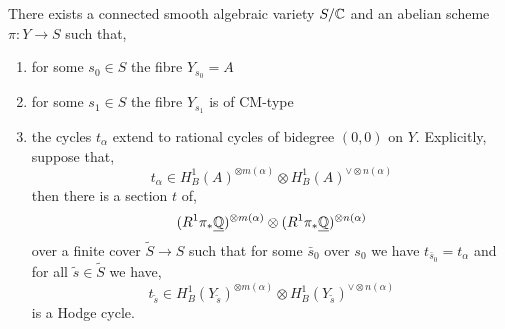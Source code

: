 \documentclass[12pt]{article}
\begin{document}
\begin{proposition}
There exists a connected smooth algebraic variety $S / \mathbb{C}$ and an abelian scheme $\pi : Y \to S$ such that,
\begin{enumerate}
\item for some $s_0 \in S$ the fibre $Y_{s_0} = A$
\item for some $s_1 \in S$ the fibre $Y_{s_1}$ is of CM-type
\item the cycles $t_\alpha$ extend to rational cycles of bidegree $(0,0)$ on $Y$. Explicitly, suppose that,
\[ t_\alpha \in H_B^1(A)^{\otimes m(\alpha)} \otimes H_B^1(A)^{\vee \otimes n(\alpha)} \]
then there is a section $t$ of,
\[ (R^1 \pi_* \underline{\mathbb{Q}})^{\otimes m(\alpha)} \otimes (R^1 \pi_* \underline{\mathbb{Q}})^{\otimes n(\alpha)} \]
over a finite cover $\tilde{S} \to S$ such that for some $\bar{s}_0$ over $s_0$ we have $t_{\bar{s}_0} = t_\alpha$ and for all $\tilde{s} \in \tilde{S}$ we have, 
\[ t_{\tilde{s}} \in H^1_B(Y_{\tilde{s}})^{\otimes m(\alpha)} \otimes H^1_B(Y_{\tilde{s}})^{\vee \otimes n(\alpha)} \]
is a Hodge cycle. 
\end{enumerate}
\end{proposition}

\newcommand{\Gr}{\mathrm{Gr}}
\newcommand{\Lie}{\mathrm{Lie}}
\end{document}
